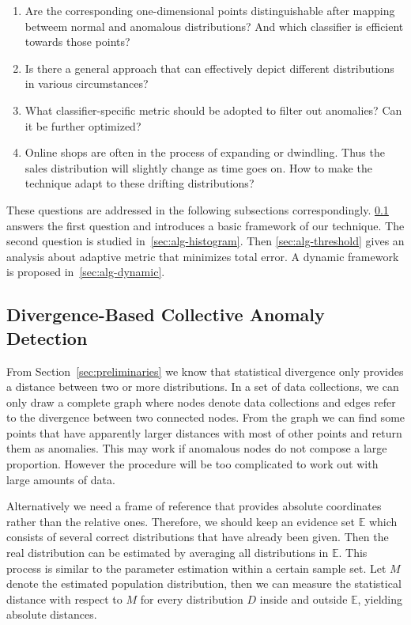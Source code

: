 \documentclass[10pt,conference,letterpaper]{IEEEtran}
\begin{document}
		\begin{enumerate}
			\item Are the corresponding one-dimensional points distinguishable after mapping betweem normal and anomalous distributions? And which classifier is efficient towards those points?
			\item Is there a general approach that can effectively depict different distributions in various circumstances?
			\item What classifier-specific metric should be adopted to filter out anomalies? Can it be further optimized?
			\item Online shops are often in the process of expanding or dwindling. Thus the sales distribution will slightly change as time goes on. How to make the technique adapt to these drifting distributions?
		\end{enumerate}
	
		These questions are addressed in the following subsections correspondingly.
		\ref{sec:alg-basic} answers the first question and introduces a basic framework of our technique. The second question is studied in~\ref{sec:alg-histogram}. Then \ref{sec:alg-threshold} gives an analysis about adaptive metric that minimizes total error. A dynamic framework is proposed in~\ref{sec:alg-dynamic}.
	
		\subsection{Divergence-Based Collective Anomaly Detection}\label{sec:alg-basic}
			From Section~\ref{sec:preliminaries} we know that statistical divergence only provides a distance between two or more distributions. In a set of data collections, we can only draw a complete graph where nodes denote data collections and edges refer to the divergence between two connected nodes. From the graph we can find some points that have apparently larger distances with most of other points and return them as anomalies. This may work if anomalous nodes do not compose a large proportion. However the procedure will be too complicated to work out with large amounts of data. 
	
			Alternatively we need a frame of reference that provides absolute coordinates rather than the relative ones. Therefore, we should keep an evidence set $\mathbb{E}$ which consists of several correct distributions that have already been given. Then the real distribution can be estimated by averaging all distributions in $\mathbb{E}$. This process is similar to the parameter estimation within a certain sample set. Let $M$ denote the estimated population distribution, then we can measure the statistical distance with respect to $M$ for every distribution $D$ inside and outside $\mathbb{E}$, yielding absolute distances. 
			
\end{document}
